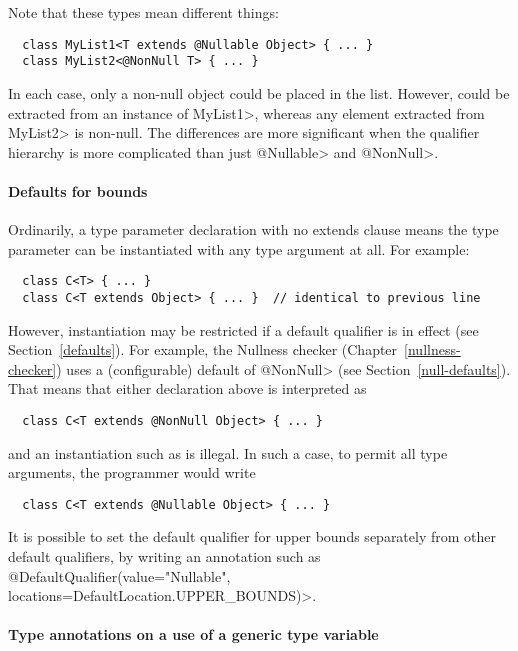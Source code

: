 Note that these types mean different things:
\begin{Verbatim}
  class MyList1<T extends @Nullable Object> { ... }
  class MyList2<@NonNull T> { ... }
\end{Verbatim}

In each case, only a non-null object could be placed in the list.  However,
 could be extracted from an instance of \<MyList1>, whereas any
element extracted from \<MyList2> is non-null.  The differences are more
significant when the qualifier hierarchy is more complicated than just
\<@Nullable> and \<@NonNull>.



\paragraph{Defaults for bounds}
Ordinarily, a type parameter declaration with no extends clause means the
type parameter can be instantiated with any type argument at all.  For
example:

\begin{Verbatim}
  class C<T> { ... }
  class C<T extends Object> { ... }  // identical to previous line
\end{Verbatim}

\noindent
However, instantiation may be restricted if a default qualifier is in
effect (see Section~\ref{defaults}).  For example, the Nullness checker
(Chapter~\ref{nullness-checker}) uses a (configurable) default of
\<@NonNull> (see Section~\ref{null-defaults}).  That means that either
declaration above is interpreted as

\begin{Verbatim}
  class C<T extends @NonNull Object> { ... }
\end{Verbatim}

\noindent
and an instantiation such as  is illegal.
In such a case, to permit all type arguments, the programmer would write

\begin{Verbatim}
  class C<T extends @Nullable Object> { ... }
\end{Verbatim}


It is possible to set the default qualifier for upper bounds separately
from other default qualifiers, by writing an annotation such as
\<@DefaultQualifier(value="Nullable", locations={DefaultLocation.UPPER\_BOUNDS})>.


\paragraph{Type annotations on a use of a generic type variable}

